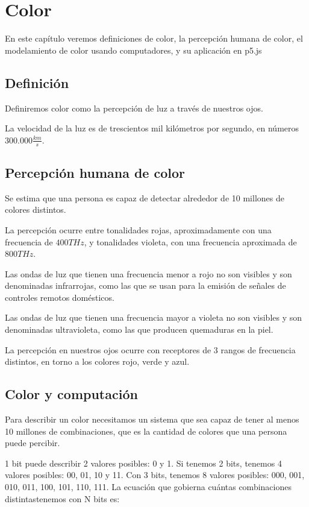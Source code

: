 \documentclass[../principal.tex]{subfiles}
\begin{document}
\chapter{Color}

En este capítulo veremos definiciones de color, la percepción humana de color, el modelamiento de color usando computadores, y su aplicación en p5.js

\section{Definición}

Definiremos color como la percepción de luz a través de nuestros ojos.

La velocidad de la luz es de trescientos mil kilómetros por segundo, en números  $300.000 \frac{km}{s}$.

\section{Percepción humana de color}

Se estima que una persona es capaz de detectar alrededor de 10 millones de colores distintos.

La percepción ocurre entre tonalidades rojas, aproximadamente con una frecuencia de $400 THz$, y tonalidades violeta, con una frecuencia aproximada de $800 THz$.

Las ondas de luz que tienen una frecuencia menor a rojo no son visibles y son denominadas infrarrojas, como las que se usan para la emisión de señales de controles remotos domésticos.

Las ondas de luz que tienen una frecuencia mayor a violeta no son visibles y son denominadas ultravioleta, como las que producen quemaduras en la piel.

La percepción en nuestros ojos ocurre con receptores de 3 rangos de frecuencia distintos, en torno a los colores rojo, verde y azul.

\section{Color y computación}

Para describir un color necesitamos un sistema que sea capaz de tener al menos 10 millones de combinaciones, que es la cantidad de colores que una persona puede percibir.

1 bit puede describir 2 valores posibles: 0 y 1. Si tenemos 2 bits, tenemos 4 valores posibles: 00, 01, 10 y 11. Con 3 bits, tenemos 8 valores posibles: 000, 001, 010, 011, 100, 101, 110, 111. La ecuación que gobierna cuántas combinaciones distintastenemos con N bits es:
\end{document}
